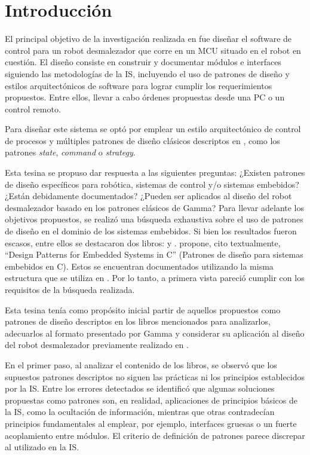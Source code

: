 \chapter{Introducción}

El principal objetivo de la investigación realizada en \cite{paperPomponio} fue diseñar el software de control para un robot desmalezador que corre en un \gls{MCU} situado en el robot en cuestión. El diseño consiste en construir y documentar módulos e interfaces siguiendo las metodologías de la \gls{IS}, incluyendo el uso de patrones de diseño y estilos arquitectónicos de software para lograr cumplir los requerimientos propuestos. Entre ellos, llevar a cabo órdenes propuestas desde una PC o un control remoto.

Para diseñar este sistema se optó por emplear un estilo arquitectónico de control de procesos \cite[pág. 27]{ShawGarlan1996} y múltiples patrones de diseño clásicos descriptos en \cite{Gamma:1995:DPE:186897}, como los patrones \textit{state}, \textit{command} o \textit{strategy}.

Esta tesina se propuso dar respuesta a las siguientes preguntas: ¿Existen patrones de diseño específicos para robótica, sistemas de control y/o sistemas embebidos? ¿Están debidamente documentados? ¿Pueden ser aplicados al diseño del robot desmalezador basado en los patrones clásicos de Gamma? Para llevar adelante los objetivos propuestos, se realizó una búsqueda exhaustiva sobre el uso de patrones de diseño en el dominio de los sistemas embebidos. Si bien los resultados fueron escasos,  entre ellos se destacaron dos libros: \cite{douglass} y \cite{elecia}. \cite{douglass} propone, cito textualmente, ``Design Patterns for Embedded Systems in C'' (Patrones de diseño para sistemas embebidos en C). Estos se encuentran documentados utilizando la misma estructura que se utiliza en \cite{Gamma:1995:DPE:186897}. Por lo tanto, a primera vista pareció cumplir con los requisitos de la búsqueda realizada.

Esta tesina tenía como propósito inicial partir de aquellos propuestos como patrones de diseño descriptos en los libros mencionados para analizarlos, adecuarlos al formato presentado por Gamma \cite{Gamma:1995:DPE:186897} y considerar su aplicación al diseño del robot desmalezador previamente realizado en \cite{paperPomponio}.

En el primer paso, al analizar el contenido de los libros, se observó que los supuestos patrones descriptos no siguen las prácticas ni los principios establecidos por la \gls{IS}. Entre los errores detectados se identificó que algunas soluciones propuestas como patrones son, en realidad, aplicaciones de principios básicos de la \gls{IS}, como la ocultación de información, mientras que otras contradecían principios fundamentales al emplear, por ejemplo, interfaces gruesas o un fuerte acoplamiento entre módulos. El criterio de definición de patrones parece discrepar al utilizado en la \gls{IS}.

